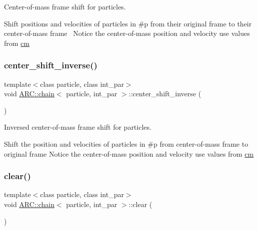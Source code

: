 Center-\/of-\/mass frame shift for particles. 

Shift positions and velocities of particles in \#p from their original frame to their center-\/of-\/mass frame~\newline
Notice the center-\/of-\/mass position and velocity use values from \hyperlink{classARC_1_1chain_a2eead75bd916fa7ffc05341645527847}{cm} \hypertarget{classARC_1_1chain_a7bd0d1b03bcc2e7cdb146960e9d55ea3}{}\label{classARC_1_1chain_a7bd0d1b03bcc2e7cdb146960e9d55ea3} 
\subsubsection{\texorpdfstring{center\+\_\+shift\+\_\+inverse()}{center\_shift\_inverse()}}
{\footnotesize\ttfamily template$<$class particle, class int\+\_\+par$>$ \\
void \hyperlink{classARC_1_1chain}{A\+R\+C\+::chain}$<$ particle, int\+\_\+par $>$\+::center\+\_\+shift\+\_\+inverse (\begin{DoxyParamCaption}{ }\end{DoxyParamCaption})\hspace{0.3cm}{\ttfamily [inline]}}



Inversed center-\/of-\/mass frame shift for particles. 

Shift the position and velocities of particles in \#p from center-\/of-\/mass frame to original frame Notice the center-\/of-\/mass position and velocity use values from \hyperlink{classARC_1_1chain_a2eead75bd916fa7ffc05341645527847}{cm} \hypertarget{classARC_1_1chain_a61d47f9599d4f7176b8870f825305011}{}\label{classARC_1_1chain_a61d47f9599d4f7176b8870f825305011} 
\subsubsection{\texorpdfstring{clear()}{clear()}}
{\footnotesize\ttfamily template$<$class particle, class int\+\_\+par$>$ \\
void \hyperlink{classARC_1_1chain}{A\+R\+C\+::chain}$<$ particle, int\+\_\+par $>$\+::clear (\begin{DoxyParamCaption}{ }\end{DoxyParamCaption})\hspace{0.3cm}{\ttfamily [inline]}}



